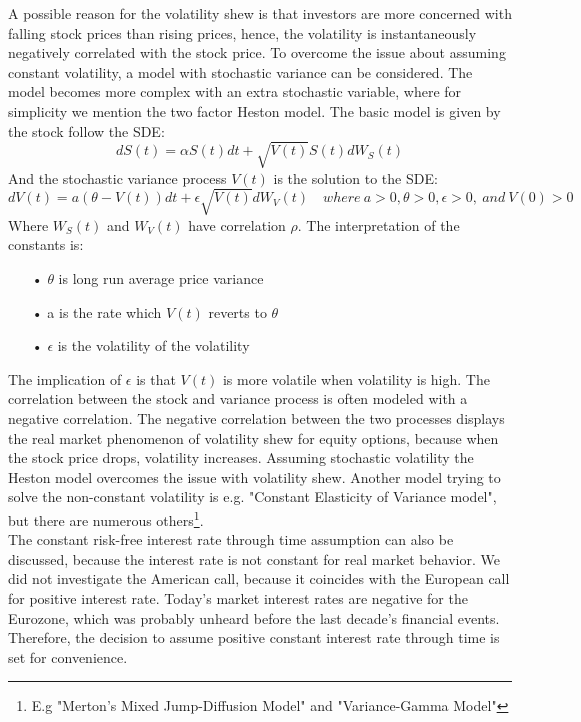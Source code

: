 A possible reason for the volatility shew is that investors are more concerned with falling stock prices than rising prices, hence, the volatility is instantaneously negatively correlated with the stock price. To overcome the issue about assuming constant volatility, a model with stochastic variance can be considered. The model becomes more complex with an extra stochastic variable, where for simplicity we mention the two factor Heston model. The basic model is given by the stock follow the SDE:
$$dS(t)=\alpha S(t) dt + \sqrt{V(t)} S(t) dW_S(t)$$
And the stochastic variance process $V(t)$ is the solution to the SDE:
$$dV(t)=a(\theta - V(t))dt + \epsilon \sqrt{V(t)} dW_V(t) \quad where \ a>0,\theta>0, \epsilon>0, \ and \ V(0)>0$$
Where $W_S(t)$ and $W_V(t)$ have correlation $\rho$. The interpretation of the constants is:
\begin{enumerate}
\item[•] $\theta$ is long run average price variance
\item[•] a is the rate which $V(t)$ reverts to $\theta$
\item[•] $\epsilon$ is the volatility of the volatility
\end{enumerate} 
The implication of $\epsilon$ is that $V(t)$ is more volatile when volatility is high. The correlation between the stock and variance process is often modeled with a negative correlation. The negative correlation between the two processes displays the real market phenomenon of volatility shew for equity options, because when the stock price drops, volatility increases. Assuming stochastic volatility the Heston model overcomes the issue with volatility shew. Another model trying to solve the non-constant volatility is e.g. "Constant Elasticity of Variance model", but there are numerous others\footnote{E.g "Merton's Mixed Jump-Diffusion Model" and "Variance-Gamma Model"}. \\

The constant risk-free interest rate through time assumption can also be discussed, because the interest rate is not constant for real market behavior. We did not investigate the American call, because it coincides with the European call for positive interest rate. Today's market interest rates are negative for the Eurozone, which was probably unheard before the last decade's financial events. Therefore, the decision to assume positive constant interest rate through time is set for convenience.\\

